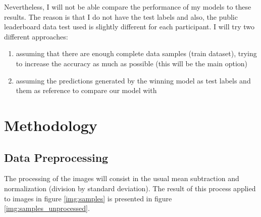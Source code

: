 \documentclass[]{article}
\begin{document}
Nevertheless, I will not be able compare the performance of my models to these results. The reason is that I do not have the test labels and also, the public leaderboard data test used is slightly different for each participant. I will try two different approaches:
\begin{enumerate}
	\item assuming that there are enough complete data samples (train dataset), trying to increase the accuracy as much as possible (this will be the main option)
	\item assuming the predictions generated by the winning model as test labels and them as reference to compare our model with
\end{enumerate}

\section{Methodology}\label{iii.-methodology}


\subsection{Data Preprocessing}\label{data-preprocessing}

The processing of the images will consist in the usual mean subtraction and normalization (division by standard deviation). The result of this process applied to images in figure \ref{img:samples} is presented in figure \ref{img:samples_unprocessed}. 
\end{document}
